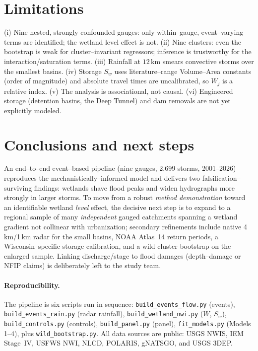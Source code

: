 \documentclass[11pt]{article}
\newcommand{\Wj}{W_{j}}
\begin{document}
\section{Limitations}
(i) Nine nested, strongly confounded gauges: only within--gauge, event--varying terms are
identified; the wetland level effect is not. (ii) Nine clusters: even the bootstrap is weak
for cluster--invariant regressors; inference is trustworthy for the interaction/saturation
terms. (iii) Rainfall at $12$\,km smears convective storms over the smallest basins.
(iv) Storage $S_w$ uses literature--range Volume--Area constants (order of magnitude) and
absolute travel times are uncalibrated, so $\Wj$ is a relative index. (v) The analysis is
associational, not causal. (vi) Engineered storage (detention basins, the Deep Tunnel) and
dam removals are not yet explicitly modeled.

\section{Conclusions and next steps}
An end--to--end event--based pipeline (nine gauges, 2{,}699 storms, 2001--2026) reproduces the
mechanistically--informed model and delivers two falsification--surviving findings: wetlands
shave flood peaks and widen hydrographs more strongly in larger storms. To move from a
robust \emph{method demonstration} toward an identifiable wetland \emph{level} effect, the
decisive next step is to expand to a regional sample of many \emph{independent} gauged
catchments spanning a wetland gradient not collinear with urbanization; secondary refinements
include native 4\,km/1\,km radar for the small basins, NOAA Atlas~14 return periods, a
Wisconsin--specific storage calibration, and a wild cluster bootstrap on the enlarged sample.
Linking discharge/stage to flood damages (depth--damage or NFIP claims) is deliberately left
to the study team.

\paragraph{Reproducibility.} The pipeline is six scripts run in sequence:
\texttt{build\_events\_flow.py} (events), \texttt{build\_events\_rain.py} (radar rainfall),
\texttt{build\_wetland\_nwi.py} ($W$, $S_w$), \texttt{build\_controls.py} (controls),
\texttt{build\_panel.py} (panel), \texttt{fit\_models.py} (Models 1--4), plus
\texttt{wild\_bootstrap.py}. All data sources are public: USGS NWIS, IEM Stage~IV, USFWS NWI,
NLCD, POLARIS, gNATSGO, and USGS 3DEP.
\end{document}
